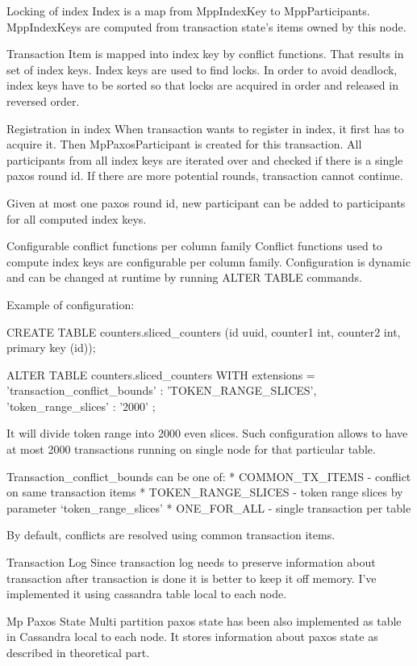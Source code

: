 Locking of index
Index is a map from MppIndexKey to MppParticipants. MppIndexKeys are computed from transaction state’s items owned by this node. 


Transaction Item is mapped into index key by conflict functions. That results in set of index keys. Index keys are used to find locks. In order to avoid deadlock, index keys have to be sorted so that locks are acquired in order and released in reversed order.


Registration in index
When transaction wants to register in index, it first has to acquire it. Then MpPaxosParticipant is created for this transaction. All participants from all index keys are iterated over and checked if there is a single paxos round id. If there are more potential rounds, transaction cannot continue. 


Given at most one paxos round id, new participant can be added to participants for all computed index keys.


Configurable conflict functions per column family
Conflict functions used to compute index keys are configurable per column family. Configuration is dynamic and can be changed at runtime by running ALTER TABLE commands.


Example of configuration:


CREATE TABLE counters.sliced_counters (id uuid, counter1 int, counter2 int, primary key (id));


ALTER TABLE counters.sliced_counters WITH extensions = { 'transaction_conflict_bounds' : 'TOKEN_RANGE_SLICES', 'token_range_slices' : '2000' };


It will divide token range into 2000 even slices. Such configuration allows to have at most 2000 transactions running on single node for that particular table.


Transaction_conflict_bounds can be one of:
* COMMON_TX_ITEMS - conflict on same transaction items
* TOKEN_RANGE_SLICES - token range slices by parameter ‘token_range_slices’
* ONE_FOR_ALL - single transaction per table


By default, conflicts are resolved using common transaction items.


Transaction Log
Since transaction log needs to preserve information about transaction after transaction is done it is better to keep it off memory. I’ve implemented it using cassandra table local to each node. 


Mp Paxos State
Multi partition paxos state has been also implemented as table in Cassandra local to each node. It stores information about paxos state as described in theoretical part.


